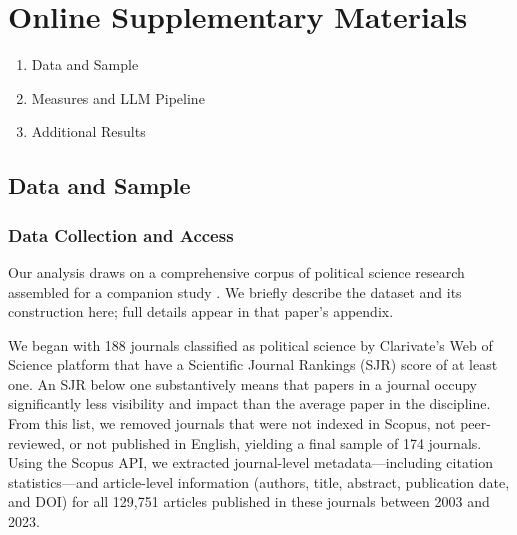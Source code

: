 \documentclass[12pt]{article}
\begin{document}


\vspace{0em}
\section{Online Supplementary Materials}
\bigskip
\noindent{}

\begin{enumerate}\itemsep0ex
    \item[A.1.] Data and Sample
    \item[A.2.] Measures and LLM Pipeline
    \item[A.3.] Additional Results
\end{enumerate}

\bigskip

\subsection{Data and Sample}

\subsubsection*{Data Collection and Access}

Our analysis draws on a comprehensive corpus of political science research assembled for a companion study \citep{grossman2025political}. We briefly describe the dataset and its construction here; full details appear in that paper's appendix.

We began with 188 journals classified as political science by Clarivate's Web of Science platform that have a Scientific Journal Rankings (SJR) score of at least one. An SJR below one substantively means that papers in a journal occupy significantly less visibility  and  impact  than  the  average  paper  in  the  discipline. From this list, we removed journals that were not indexed in Scopus, not peer-reviewed, or not published in English, yielding a final sample of 174 journals. Using the Scopus API, we extracted journal-level metadata---including citation statistics---and article-level information (authors, title, abstract, publication date, and DOI) for all 129,751 articles published in these journals between 2003 and 2023.
\end{document}
